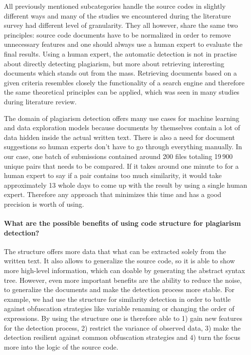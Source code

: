 All previously mentioned subcategories handle the source codes in slightly different ways and many of the studies we encountered during the literature survey had different level of granularity. They all however, share the same two principles: source code documents have to be normalized in order to remove unnecessary features and one should always use a human expert to evaluate the final results. Using a human expert, the automatic detection is not in practise about directly detecting plagiarism, but more about retrieving interesting documents which stands out from the mass. Retrieving documents based on a given criteria resembles closely the functionality of a search engine and therefore the same theoretical principles can be applied, which was seen in many studies during literature review. 

The domain of plagiarism detection offers many use cases for machine learning and data exploration models because documents by themselves contain a lot of data hidden inside the actual written text. There is also a need for document suggestions so human experts don't have to go through everything manually. In our case, one batch of submissions contained around 200 files totaling 19\,900 unique pairs that needs to be compared. If it takes around one minute to for a human expert to say if a pair contains too much similarity, it would take approximately 13 whole days to come up with the result by using a single human expert. Therefore any approach that minimizes this time and has a good precision is worth of using.

\paragraph{What are the possible benefits of using code structure for plagiarism detection?}

The structure offers more data that what can be extracted solely from the 
written text. It also allows to generalize the source code, so it is able to show more high-level information, which can doable by generating the abstract syntax tree. However, even more important benefits are the ability to reduce the noise, to generalize the documents and make the detection process more stable. For example, we had use the structure for similarity detection in order to battle against obfuscation strategies like variable renaming or changing the order of expressions. By using the structure one is therefore able to 1) gain new features for the detection process, 2) restrict the variance of observed data, 3) make the detection resilient against common obfuscation strategies and 4) turn the focus more into the logic of the source code.



